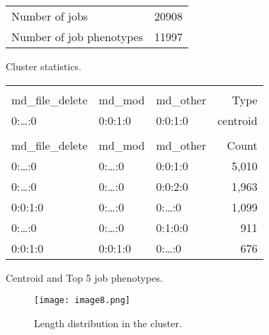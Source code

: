 \documentclass{jhps}
\begin{document}
\noindent\begin{minipage}{\textwidth}
\captionsetup{type=table}

\begingroup
  \begin{subtable}{\textwidth}
  \centering
  \begin{tabular}{ll}
    Number of jobs & 20908 \\
    Number of job phenotypes & 11997 \\
  \end{tabular}
  \caption{Cluster statistics.}
  \label{tab:hex_native:stats}
  \end{subtable}
\endgroup

\medskip

\begingroup
  \begin{subtable}{\textwidth}
  \centering
  \begin{tiny}
    \begin{tabular}{lll|r}
      \rowcolor{tblhead}
      \multicolumn{3}{l|}{Hexadecimal coding} &            \\
      \rowcolor{tblhead}
      md\_file\_delete     &  md\_mod   & md\_other & Type     \\
      \hline
      0:\dots:0            &  0:0:1:0   & 0:0:1:0   & centroid \\
      \multicolumn{4}{l}{} \\
      \rowcolor{tblhead}
      md\_file\_delete     &  md\_mod   & md\_other & Count    \\
      \hline
      0:\dots:0            &  0:\dots:0 & 0:0:1:0   & 5,010    \\
      0:\dots:0            &  0:\dots:0 & 0:0:2:0   & 1,963    \\
      0:0:1:0              &  0:\dots:0 & 0:\dots:0 & 1,099    \\
      0:\dots:0            &  0:\dots:0 & 0:1:0:0   & 911      \\
      0:0:1:0              &  0:0:1:0   & 0:\dots:0 & 676      \\
    \end{tabular}
  \end{tiny}
  \caption{Centroid and Top 5 job phenotypes.}
  \label{tab:hex_native:top_jobs}
  \end{subtable}
\endgroup

\medskip

\begingroup
  \begin{subfigure}{\textwidth}
  \centering
  \texttt{[image: image8.png]}
  \caption{Length distribution in the cluster.}
  \label{fig:hex_native:length}
  \end{subfigure}
\endgroup

\label{fig:hex_native}
\end{minipage}
\end{document}
